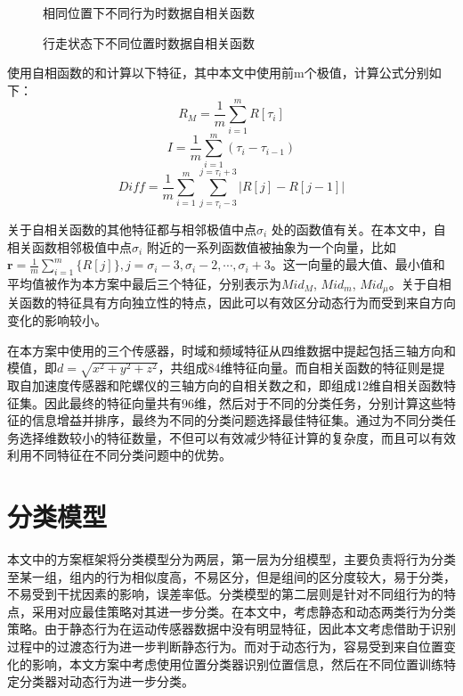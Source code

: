\begin{figure}[!htb]
    \centering
    \caption{相同位置下不同行为时数据自相关函数}
\end{figure}

\begin{figure}[!htb]
    \centering
    \caption{行走状态下不同位置时数据自相关函数}
\end{figure}

\par 使用自相函数的和计算以下特征，其中本文中使用前m个极值，计算公式分别如下：
\begin{equation}
    R_M = \frac {1}{m}\sum_{i=1}^m R[\tau_i]
\end{equation}
\begin{equation}
    I = \frac{1}{m}\sum_{i=1}^m {(\tau_i-\tau_{i-1})}
\end{equation}
\begin{equation}
    Diff = \frac{1}{m}\sum_{i=1}^m \sum_{j=\tau_i-3}^{j=\tau_i+3} {|R[j]-R[j-1]|}
\end{equation}
\par 关于自相关函数的其他特征都与相邻极值中点$\sigma_i$ 处的函数值有关。在本文中，自相关函数相邻极值中点$\sigma_i$ 附近的一系列函数值被抽象为一个向量，比如 $\textbf{r}=\frac {1}{m} \sum_{i=1}^m\{R[j]\}, j=\sigma_i-3, \sigma_i-2,\cdots,\sigma_i+3$。这一向量的最大值、最小值和平均值被作为本方案中最后三个特征，分别表示为$Mid_M$, $Mid_m$, $Mid_\mu$。关于自相关函数的特征具有方向独立性的特点，因此可以有效区分动态行为而受到来自方向变化的影响较小。
\par 在本方案中使用的三个传感器，时域和频域特征从四维数据中提起包括三轴方向和模值，即$d=\sqrt{x^2+y^2+z^2}$，共组成84维特征向量。而自相关函数的特征则是提取自加速度传感器和陀螺仪的三轴方向的自相关数之和，即组成12维自相关函数特征集。因此最终的特征向量共有96维，然后对于不同的分类任务，分别计算这些特征的信息增益并排序，最终为不同的分类问题选择最佳特征集。通过为不同分类任务选择维数较小的特征数量，不但可以有效减少特征计算的复杂度，而且可以有效利用不同特征在不同分类问题中的优势。

\section{分类模型}
\par 本文中的方案框架将分类模型分为两层，第一层为分组模型，主要负责将行为分类至某一组，组内的行为相似度高，不易区分，但是组间的区分度较大，易于分类，不易受到干扰因素的影响，误差率低。分类模型的第二层则是针对不同组行为的特点，采用对应最佳策略对其进一步分类。在本文中，考虑静态和动态两类行为分类策略。由于静态行为在运动传感器数据中没有明显特征，因此本文考虑借助于识别过程中的过渡态行为进一步判断静态行为。而对于动态行为，容易受到来自位置变化的影响，本文方案中考虑使用位置分类器识别位置信息，然后在不同位置训练特定分类器对动态行为进一步分类。
